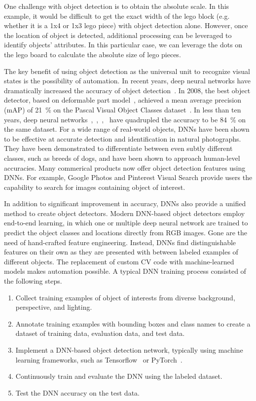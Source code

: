 One challenge with object detection is to obtain the absolute scale. In this
example, it would be difficult to get the exact width of the lego block (e.g.
whether it is a 1x4 or 1x3 lego piece) with object detection alone. However,
once the location of object is detected, additional processing can be leveraged
to identify objects' attributes. In this particular case, we can leverage the
dots on the lego board to calculate the absolute size of lego pieces.

The key benefit of using object detection as the universal unit to recognize
visual states is the possibility of automation. In recent years, deep neural
networks have dramatically increased the accuracy of object
detection~\cite{zou2019object}. In 2008, the best object detector, based on
deformable part model~\cite{felzenszwalb2008discriminatively}, achieved a mean
average precision (mAP) of 21~\% on the Pascal Visual Object Classes
dataset~\cite{everingham2010pascal}. In less than ten years, deep neural
networks~\cite{he2017mask},~\cite{Ren2015},~\cite{He2016},~\cite{lin2017focal}
have quadrupled the accuracy to be 84~\% on the same dataset. For a wide range
of real-world objects, DNNs have been shown to be effective at accurate
detection and identification in natural photographs.  They have been
demonstrated to differentiate between even subtly different classes, such as
breeds of dogs, and have been shown to approach human-level accuracies. Many
commerical products now offer object detection features using DNNs. For example,
Google Photos and Pinterest Visual Search provide users the capability to search
for images containing object of interest.

In addition to significant improvement in accuracy, DNNs also provide a unified
method to create object detectors. Modern DNN-based object detectors employ
end-to-end learning, in which one or multiple deep neural network are trained to
predict the object classes and locations directly from RGB images. Gone are the
need of hand-crafted feature engineering. Instead, DNNs find distinguishable
features on their own as they are presented with between labeled examples of
different objects. The replacement of custom CV code with machine-learned models
makes automation possible. A typical DNN training process consisted of the
following steps.

\begin{enumerate}
  \item Collect training examples of object of interests from diverse
  background, perspective, and lighting.
  \item Annotate training examples with bounding boxes and class names to create
  a dataset of training data, evaluation data, and test data.
  \item Implement a DNN-based object detection network, typically using machine learning frameworks,
  such as Tensorflow~\cite{abadi2016tensorflow} or
  PyTorch~\cite{paszke2019pytorch}.
  \item Continuously train and evaluate the DNN using the labeled dataset.
  \item Test the DNN accuracy on the test data.
\end{enumerate}

